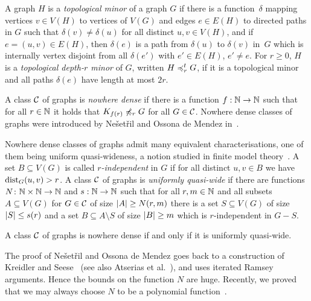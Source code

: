 A graph $H$ is a \emph{topological minor} of a graph $G$ if there is a
function~$\delta$ mapping vertices $v\in V(H)$ to vertices of $V(G)$ and 
edges $e\in E(H)$ to directed paths in $G$ such that 
$\delta(v)\neq \delta(u)$ for all distinct $u,v\in V(H)$, and 
if $e=(u,v)\in E(H)$, then $\delta(e)$ is a path from 
$\delta(u)$ to $\delta(v)$ in~$G$ which is internally vertex disjoint from all 
$\delta(e')$ with $e'\in E(H)$, $e'\neq e$. 
For $r\geq 0$, $H$ is a \emph{topological depth-$r$ minor} of $G$, 
written $H\preccurlyeq_r^tG$, if it is a topological minor and all paths $\delta(e)$
have length at most $2r$. 

A class $\mathcal{C}$ of graphs is \emph{nowhere dense} if there is a function 
$f:\mathbb{N}\rightarrow \mathbb{N}$ such that for all $r\in \mathbb{N}$ it holds that $K_{f(r)}\not\preccurlyeq_r G$
for all $G\in \mathcal{C}$. Nowhere dense classes of graphs were introduced by
Ne\v{s}et\v{r}il and Ossona de Mendez in~\cite{nevsetvril2010first,nevsetvril2011nowhere}.

Nowhere dense classes of graphs admit many equivalent characterisations, 
one of them being uniform quasi-wideness, a notion studied in 
finite model theory~\cite{dawar2010homomorphism}.  
A set $B\subseteq V(G)$ is called {\em{$r$-independent}} in $G$ if for all
distinct $u,v\in B$ we have $\mathrm{dist}_G(u,v)>r$.
A class $\mathcal{C}$ of graphs is \emph{uniformly quasi-wide} if there are
functions $N\colon \mathbb{N}\times\mathbb{N}\rightarrow \mathbb{N}$ and $s:\mathbb{N}\rightarrow \mathbb{N}$ such
that for all $r,m\in \mathbb{N}$ and all subsets $A\subseteq V(G)$ for
$G\in \mathcal{C}$ of size $\left\lvert A\right\rvert\geq N(r,m)$ there is a set
$S\subseteq V(G)$ of size $\left\lvert S\right\rvert\leq s(r)$ and a set
$B\subseteq A\setminus S$ of size $\left\lvert B\right\rvert\geq m$ which is $r$-independent in
$G-S$. 

\begin{theorem}
A class $\mathcal{C}$ of graphs is nowhere dense if and only if it
is uniformly quasi-wide. 
\end{theorem}

The proof of Ne\v{s}et\v{r}il and Ossona de Mendez goes back to a construction
of Kreidler and Seese~\cite{kreidler1998monadic} (see also Atserias et al.~\cite{atserias2006preservation}), 
and uses iterated
Ramsey arguments. Hence the bounds on the function $N$ are huge. Recently, 
we proved that we may always choose $N$ to be a polynomial 
function~\cite{siebertz2016polynomial}. 

